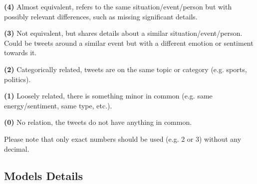 \noindent \textbf{(4)} Almost equivalent, refers to the same situation/event/person but with possibly relevant differences, such as missing significant details.

\noindent \textbf{(3)} Not equivalent, but shares details about a similar situation/event/person. Could be tweets around a similar event but with a different emotion or sentiment towards it.

\noindent \textbf{(2)} Categorically related, tweets are on the same topic or category (e.g. sports, politics).

\noindent \textbf{(1)} Loosely related, there is something minor in common (e.g. same energy/sentiment, same type, etc.).

\noindent \textbf{(0)} No relation, the tweets do not have anything in common.

Please note that only exact numbers should be used (e.g. 2 or 3) without any decimal.

\subsection{Models Details}


